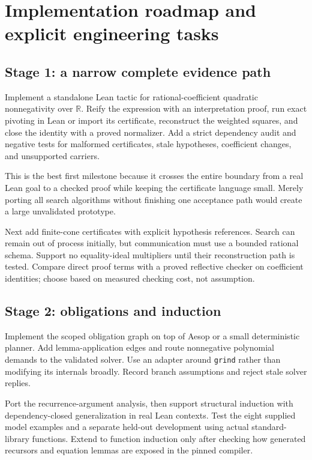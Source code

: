 \documentclass[11pt,letterpaper]{article}
\newcommand{\Lean}{\textsf{Lean}}
\newcommand{\grind}{\texttt{grind}}
\newcommand{\R}{\mathbb{R}}
\theoremstyle{definition}
\theoremstyle{remark}
\begin{document}
\section{Implementation roadmap and explicit engineering tasks}
\subsection{Stage 1: a narrow complete evidence path}
Implement a standalone \Lean{} tactic for rational-coefficient quadratic nonnegativity over $\R$. Reify the expression with an interpretation proof, run exact pivoting in \Lean{} or import its certificate, reconstruct the weighted squares, and close the identity with a proved normalizer. Add a strict dependency audit and negative tests for malformed certificates, stale hypotheses, coefficient changes, and unsupported carriers.

This is the best first milestone because it crosses the entire boundary from a real \Lean{} goal to a checked proof while keeping the certificate language small. Merely porting all search algorithms without finishing one acceptance path would create a large unvalidated prototype.

Next add finite-cone certificates with explicit hypothesis references. Search can remain out of process initially, but communication must use a bounded rational schema. Support no equality-ideal multipliers until their reconstruction path is tested. Compare direct proof terms with a proved reflective checker on coefficient identities; choose based on measured checking cost, not assumption.

\subsection{Stage 2: obligations and induction}
Implement the scoped obligation graph on top of Aesop or a small deterministic planner. Add lemma-application edges and route nonnegative polynomial demands to the validated solver. Use an adapter around \grind{} rather than modifying its internals broadly. Record branch assumptions and reject stale solver replies.

Port the recurrence-argument analysis, then support structural induction with dependency-closed generalization in real \Lean{} contexts. Test the eight supplied model examples and a separate held-out development using actual standard-library functions. Extend to function induction only after checking how generated recursors and equation lemmas are exposed in the pinned compiler.
\end{document}
